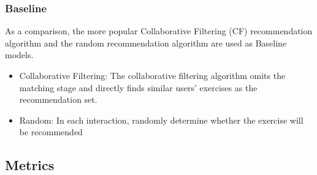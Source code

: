 \subsubsection{Baseline}

As a comparison, the more popular Collaborative Filtering (CF) recommendation algorithm and the random recommendation algorithm are used as Baseline models.
\begin{itemize}
  \item Collaborative Filtering: The collaborative filtering algorithm omits the matching stage and directly finds similar users' exercises as the recommendation set.
  \item Random: In each interaction, randomly determine whether the exercise will be recommended
\end{itemize}


\subsection{Metrics}


